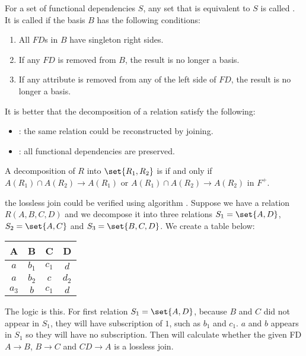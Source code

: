\begin{definition}[basis]
    For a set of functional dependencies $S$, any set that is equivalent to $S$ is called . It is called  if the basis $B$ has the following conditions:
    \begin{enumerate}
        \item All $FD$s in $B$ have singleton right sides.
        \item If any $FD$ is removed from $B$, the result is no longer a basis.
        \item If any attribute is removed from any of the left side of $FD$, the result is no longer a basis.
    \end{enumerate}
\end{definition}


It is better that the decomposition of a relation satisfy the following:
\begin{itemize}
    \item {}: the same relation could be reconstructed by joining.
    \item {}: all functional dependencies are preserved.
\end{itemize}

\begin{theorem}
    A decomposition of $R$ into $\set{R_1, R_2}$ is  if and only if $A(R_1) \cap A(R_2) \rightarrow A(R_1)$ or $A(R_1) \cap A(R_2) \rightarrow A(R_2)$ in $F^{+}$.
\end{theorem}


the lossless join could be verified using  algorithm \cite{Aho1979}. Suppose we have a relation $R(A,B,C,D)$ and we decompose it into three relations $S_1 = \set{A,D}$, $S_2 = \set{A,C}$ and $S_3 = \set{B,C,D}$. We create a table below:

\begin{center} 
   \begin{tabular}{|c|c|c|c|}
  \hline
  A & B & C & D \\
  \hline
  $a$ & $b_1$ & $c_1$ & $d$ \\
  \hline
  $a$ & $b_2$ & $c$ & $d_2$ \\
  \hline
  $a_3$ & $b$ & $c_1$ & $d$ \\
  \hline
\end{tabular} 
\end{center}

The logic is this. For first relation  $S_1 = \set{A,D}$, because $B$ and $C$ did not appear in $S_1$, they will have subscription of $1$, such as $b_1$ and $c_1$. $a$ and $b$ appears in $S_1$ so they will have no subscription. Then will calculate whether the given FD $A \rightarrow B$, $B \rightarrow C$ and $CD \rightarrow A$ is a lossless join.


